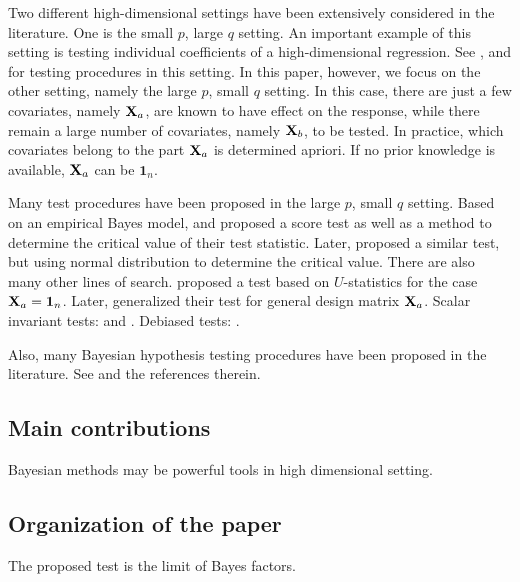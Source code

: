 \documentclass[11pt]{article}
\theoremstyle{plain}
\theoremstyle{definition}
\theoremstyle{remark}
\begin{document}
Two different high-dimensional settings have been extensively considered in the literature.
One is the small $p$, large $q$ setting.
An important example of this setting is testing individual coefficients of a high-dimensional regression.
See \cite{buhlmann2013statistical}, \cite{Zhang2013} and \cite{Lan2016} for testing procedures in this setting.
In this paper, however, we focus on the other setting, namely the large $p$, small $q$ setting.
In this case, there are just a few covariates, namely $\mathbf{X}_a$, are known to have effect on the response, while there remain a large number of covariates, namely $\mathbf{X}_b$, to be tested.
In practice, which covariates belong to the part $\mathbf{X}_a$ is determined apriori.
If no prior knowledge is available, $\mathbf{X}_a$ can be $\mathbf 1_n$.

Many test procedures have been proposed in the large $p$, small $q$ setting.
Based on an empirical Bayes model, \cite{Goeman2006} and \cite{Goeman2011} proposed a score test as well as a method to determine the critical value of their test statistic.
Later, \cite{Lan2014Testing} proposed a similar test, but using normal distribution to determine the critical value.
There are also many other lines of search.
\cite{Zhong2011Tests} proposed a test based on $U$-statistics for the case $\mathbf{X}_a=\mathbf 1_n$.
Later, \cite{Wang2015} generalized their test for general design matrix $\mathbf{X}_a$.
Scalar invariant tests: \cite{Feng2013} and \cite{Xu2016a}.
Debiased tests: .



Also, many Bayesian hypothesis testing procedures have been proposed in the literature.
See \cite{javier2006Obj,Goddard2016,zhou2018On} and the references therein.

\subsection{Main contributions}
Bayesian methods may be powerful tools in high dimensional setting.

\subsection{Organization of the paper}

The proposed test is the limit of Bayes factors.
\end{document}
